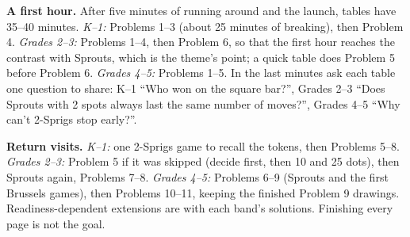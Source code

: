 \documentclass[11pt]{article}
\begin{document}
\textbf{A first hour.} After five minutes of running around and the launch, tables have 35--40 minutes. \emph{K--1:} Problems 1--3 (about 25 minutes of breaking), then Problem 4. \emph{Grades 2--3:} Problems 1--4, then Problem 6, so that the first hour reaches the contrast with Sprouts, which is the theme's point; a quick table does Problem 5 before Problem 6. \emph{Grades 4--5:} Problems 1--5. In the last minutes ask each table one question to share: K--1 ``Who won on the square bar?'', Grades 2--3 ``Does Sprouts with 2 spots always last the same number of moves?'', Grades 4--5 ``Why can't 2-Sprigs stop early?''.

\textbf{Return visits.} \emph{K--1:} one 2-Sprigs game to recall the tokens, then Problems 5--8. \emph{Grades 2--3:} Problem 5 if it was skipped (decide first, then 10 and 25 dots), then Sprouts again, Problems 7--8. \emph{Grades 4--5:} Problems 6--9 (Sprouts and the first Brussels games), then Problems 10--11, keeping the finished Problem 9 drawings. Readiness-dependent extensions are with each band's solutions. Finishing every page is not the goal.


\end{document}
